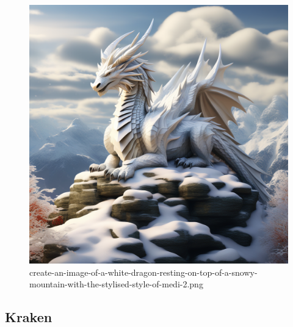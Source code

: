 \begin{figure}
\centering
\includegraphics{create-an-image-of-a-white-dragon-resting-on-top-of-a-snowy-mountain-with-the-stylised-style-of-medi-2.png}
\caption{create-an-image-of-a-white-dragon-resting-on-top-of-a-snowy-mountain-with-the-stylised-style-of-medi-2.png}
\end{figure}

\subsection{Kraken}\label{kraken}

